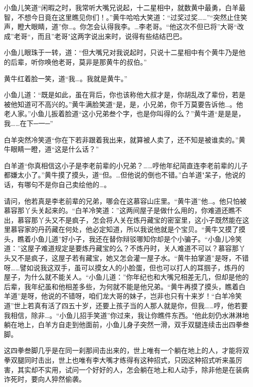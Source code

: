 \documentclass[12pt,oneside]{book}
\begin{document}
小鱼儿笑道``闲暇之时，我常听大嘴兄说起，十二星相中，就数黄中最勇，白羊最智，不想今日竟在这里瞧见你们！。''黄牛哈哈大笑道：``过奖过奖\ldots\ldots{}''``突然止住笑声，瞪大眼睛，道''你\ldots。你怎会认得我李。\ldots 李老哥。``他这次不但已将''大哥``改成''老哥``，而且''老哥"这两字说出来时，说得有些结结巴巴。

小鱼儿眼珠于一转，道：``但大嘴兄对我说起时，只说十二星相中有个黄牛乃是他的后辈，听你唤他老哥，莫非是那黄牛的叔伯。''

黄牛红着脸一笑，道``我\ldots。我就是黄牛。''

小鱼儿道：``既是如此，虽在背后，你也该称他大叔才是，你胡乱改了辈份，若是被他知道可不高兴的。''黄牛满脸笑道``是，是，小兄弟，你千万莫要告诉他\ldots。他老人家。''小鱼儿扳着脸道``这小兄弟叁个字，也是你叫得的么？''黄牛道``是是是，我\ldots\ldots 在下─一─''

白羊突然冷笑道``你在下若非跟着我出来，就算被人卖了，还不知是被谁卖的。''黄牛眼睛一瞪，道``这是什么话？''

白羊道``你真相信这小子是李老前辈的小兄弟？\ldots\ldots 哼他年纪简直连李老前辈的儿子都嫌太小了。''黄牛摸了摸头，道``但。\ldots 但他说的倒也不错。''白羊道"呆子，他说的话，有哪句不是你自己卖绘他的\ldots。

请问，他若真是李老前辈的兄弟，哪会在这慕容山庄里。``黄牛道''他\ldots。他只怕被慕容那丫头关起来的。``白羊冷笑道：''这两间屋子是做什么用的，你难道还瞧不出，慕容那丫头又不是疯子，怎会将人关在炼丹藏宝的密室里，这小子既然能在这里慕容家的丹药藏在何处，他必定知道，所以我说他就是个宝贝。``黄牛又摸了摸头，瞧着小鱼儿道''好小子，我还在替你辩驳哪知你却是个小骗子。``小鱼儿冷笑道：''这屋子难道规定是要炼丹藏宝的么？不炼丹时，关人难道不可以？慕容那丫头又不是疯子，这屋子若有藏宝，她又怎会灌一屋子水。``黄牛拍掌道''是呀，不错呀\ldots\ldots 譬如说我这双手，虽可以摸女人的小脸蛋，但也可以打人的耳掴子，炼丹的屋子，为什么就不能关人。``小鱼儿道：''你年纪也和大嘴兄相差无几，但却是他的后辈，我年纪虽和他相差多些，为何就不能是他兄弟。``黄牛再摸了摸头，瞧着白羊道''是呀，他说的不错呀，咱们龙大哥的妹子，岂非也只有十来岁！``白羊冷笑道''世上若真有活了四五十岁，还要上孩子当的人那人就是你，但我\ldots\ldots 哼，他若要我相信，除非\ldots。``小鱼儿招手笑道''你过来，我让你瞧件东西。"他此刻仍水淋淋地躺在地上，白羊方自走到他面前，小鱼儿身子突然一滑，双手双腿连续击出四拳叁脚。

这四拳叁脚几乎是在同一刹那间击出来的，世上唯有一个躺在地上的人，才能将双拳双腿同时击出，世上也唯有李大嘴才练得有这种招式，只因这种招式听来虽厉害，其实却不实用，试问一个好好的人，怎会躺在地上和人动手，除非他是在装病诈死时，要向人猝然偷袭。
\end{document}
